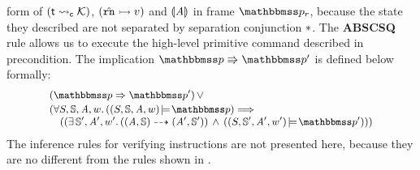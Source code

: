 form of $({\textsf{t}} \leadsto_{\textsf{c}} {\mathcal{K}})$, 
$({\hat{\texttt{rn}}} \rightarrowtail {v})$ and $\llparenthesis {\textit{A}} \rrparenthesis$ 
in frame $\relastP_r$, 
because the state they described are not separated by 
separation conjunction $*$. 
The \textbf{ABSCSQ} rule allows us to execute the high-level 
primitive command described in precondition. 
The implication $\absExec{\relastP}{\relastP'}$ 
is defined below formally: 
\[
    \small
    \begin{array}{l}
        (\relastP \Rightarrow \relastP') \, \lor \\
        \\[-9.5pt]
        (
            \forall \state, \hpstate, \primcom, \word. \, 
            (\asrtmodel{(\state, \hpstate, \primcom, \word)}
                {\relastP}) \Longrightarrow \\
            \quad
            ((\exists \, \hpstate', \primcom', \word'. \, 
        (\primTrans{(\primcom, \hpstate)}
        	{(\primcom', \hpstate')})
        \, \land \, 
        (\asrtmodel{(\state, \hpstate', \primcom', \word')}{\relastP'})))
    \end{array}
\]
The inference rules for verifying instructions are not 
presented here, because they are no different from 
the rules shown in \Fig{\ref{fig:Seleted Inference rules}}. 
        
